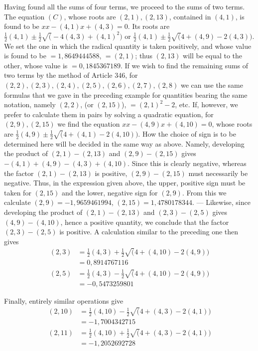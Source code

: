 Having found all the sums of four terms, we proceed to the sums of two terms. The equation \((C)\), whose roots are \((2,1),\allowbreak (2,13)\), contained in \((4,1)\), is found to be \(xx-(4,1)x+(4,3)=0\). Its roots are \(\frac12(4,1)\pm\frac12\surd(-4(4,3)+(4,1)^2)\) or \(\frac12(4,1)\pm\frac12\surd(4+(4,9)-2(4,3))\). We set the one in which the radical quantity is taken positively, and whose value is found to be \(=1{,}8649444588\), \(=(2,1)\); thus \((2,13)\) will be equal to the other, whose value is \(=0{,}1845367189\). If we wish to find the remaining sums of two terms by the method of Article 346, for \((2,2),\allowbreak (2,3),\allowbreak (2,4),\allowbreak (2,5),\allowbreak (2,6),\allowbreak (2,7),\allowbreak (2,8)\) we can use the same formulas that we gave in the preceding example for quantities bearing the same notation, namely \((2,2)\), (or \((2,15)\)), \(=(2,1)^2-2\), etc. If, however, we prefer to calculate them in pairs by solving a quadratic equation, for \((2,9),\allowbreak (2,15)\) we find the equation \(xx-(4,9)x+(4,10)=0\), whose roots are \(\frac12(4,9)\pm\frac12\surd(4+(4,1)-2(4,10))\). How the choice of sign is to be determined here will be decided in the same way as above. Namely, developing the product of \((2,1)-(2,13)\) and \((2,9)-(2,15)\) gives \(-(4,1)+(4,9)-(4,3)+(4,10)\). Since this is clearly negative, whereas the factor \((2,1)-(2,13)\) is positive, \((2,9)-(2,15)\)
must necessarily be negative. Thus, in the expression given above, the upper, positive sign must be taken for \((2,15)\) and the lower, negative sign for \((2,9)\). From this we calculate \((2,9)=-1{,}9659461994\), \((2,15)=1{,}4780178344\). — Likewise, since developing the product of \((2,1)-(2,13)\) and \((2,3)-(2,5)\) gives \((4,9)-(4,10)\), hence a positive quantity, we conclude that the factor \((2,3)-(2,5)\) is positive. A calculation similar to the preceding one then gives \[\begin{aligned}(2,3)&=\tfrac12(4,3)+\tfrac12\surd(4+(4,10)-2(4,9))\\&=0{,}8914767116\\(2,5)&=\tfrac12(4,3)-\tfrac12\surd(4+(4,10)-2(4,9))\\&=-0{,}5473259801\end{aligned}\]

Finally, entirely similar operations give \[\begin{aligned}(2,10)&=\tfrac12(4,10)-\tfrac12\surd(4+(4,3)-2(4,1))\\&=-1{,}7004342715\\(2,11)&=\tfrac12(4,10)+\tfrac12\surd(4+(4,3)-2(4,1))\\&=-1{,}2052692728\end{aligned}\]

